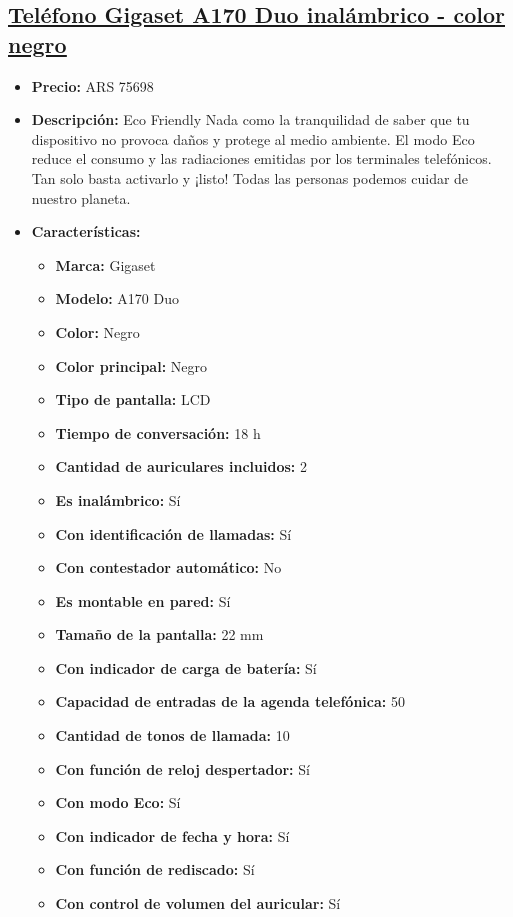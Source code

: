 \documentclass{article}
\begin{document}
\begin{adjustwidth}{2em}{}

\subsection{\uline{\href{https://www.mercadolibre.com.ar/telefono-gigaset-a170-duo-inalambrico-color-negro/p/MLA15981667}{Teléfono Gigaset A170 Duo inalámbrico - color negro}}}
\begin{itemize}
    \item \textbf{Precio:} ARS 75698
    \item \textbf{Descripción:} Eco Friendly
Nada como la tranquilidad de saber que tu dispositivo no provoca daños y protege al medio ambiente. El modo Eco reduce el consumo y las radiaciones emitidas por los terminales telefónicos. Tan solo basta activarlo y ¡listo! Todas las personas podemos cuidar de nuestro planeta.
    \item \textbf{Características:} 
    \begin{itemize}
        \item \textbf {Marca:} Gigaset
    \item \textbf {Modelo:} A170 Duo
    \item \textbf {Color:} Negro
    \item \textbf {Color principal:} Negro
    \item \textbf {Tipo de pantalla:} LCD
    \item \textbf {Tiempo de conversación:} 18 h
    \item \textbf {Cantidad de auriculares incluidos:} 2
    \item \textbf {Es inalámbrico:} Sí
    \item \textbf {Con identificación de llamadas:} Sí
    \item \textbf {Con contestador automático:} No
    \item \textbf {Es montable en pared:} Sí
    \item \textbf {Tamaño de la pantalla:} 22 mm
    \item \textbf {Con indicador de carga de batería:} Sí
    \item \textbf {Capacidad de entradas de la agenda telefónica:} 50
    \item \textbf {Cantidad de tonos de llamada:} 10
    \item \textbf {Con función de reloj despertador:} Sí
    \item \textbf {Con modo Eco:} Sí
    \item \textbf {Con indicador de fecha y hora:} Sí
    \item \textbf {Con función de rediscado:} Sí
    \item \textbf {Con control de volumen del auricular:} Sí
    \end{itemize}
\end{itemize}

\vspace{1\baselineskip} %
\end{adjustwidth}
\end{document}
